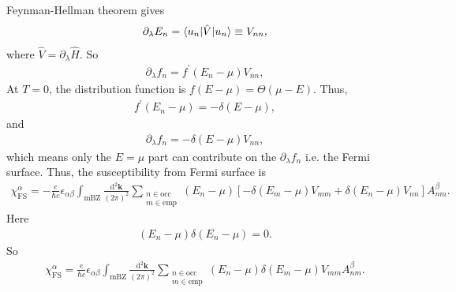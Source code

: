 \documentclass[10pt, oneside]{article}
\begin{document}
Feynman-Hellman theorem gives 
\begin{align}
	\partial_{\lambda} E_{n } = \braket{u_n |\hat{V }|u_n} \equiv V_{nn},
\end{align}
where \(\hat{V} = \partial_{\lambda} \hat{H}\). So 
\begin{align}
	\partial_{\lambda} f_{n} = f^{\prime} \left(E_{n } - \mu\right) V_{nn },
\end{align}
At \(T = 0\), the distribution function is \(f \left(E - \mu\right) = \Theta \left(\mu - E \right)\). Thus, 
\begin{align}
	f^{\prime} \left(E_{n } - \mu\right) = - \delta \left(E - \mu\right),
\end{align}
and 
\begin{align}
	\partial_{\lambda} f_{n } = - \delta \left(E - \mu\right) V_{nn},
\end{align}
which means only the \(E = \mu\) part can contribute on  the \(\partial_{\lambda} f_{n }\)  i.e. the Fermi surface. Thus, the susceptibility from Fermi surface is 
\begin{align}
	\chi^{\alpha}_{\mathrm{FS}} = - \frac{e}{\hbar c} \epsilon_{\alpha \beta} \int_{\mathrm{mBZ}} \frac{\mathrm{d}^{2} \bm{k}}{\left(2 \pi\right)^2} \sum_{\substack{n \in \mathrm{occ} \\ m \in \mathrm{emp}}} \left(E_{n } - \mu\right) \left[ - \delta \left(E_{m } - \mu \right) V_{mm } + \delta  \left(E_{n } - \mu\right) V_{nn}\right] A^{\beta}_{nm}. 
\end{align}
Here
\begin{align}
	\left(E_{n } - \mu\right) \delta \left(E_{n } - \mu\right) = 0.
\end{align}
So 
\begin{align}
	\boxed{
		\chi^{\alpha}_{\mathrm{FS}} = \frac{e}{\hbar c} \epsilon_{\alpha \beta} \int_{\mathrm{mBZ}} \frac{\mathrm{d}^{2} \bm{k}}{\left(2 \pi\right)^2} \sum_{\substack{n \in \mathrm{occ} \\ m \in \mathrm{emp}}} \left(E_{n } - \mu\right) \delta \left(E_{m } - \mu \right) V_{mm } A^{\beta}_{nm}.
	}
\end{align}
\end{document}
